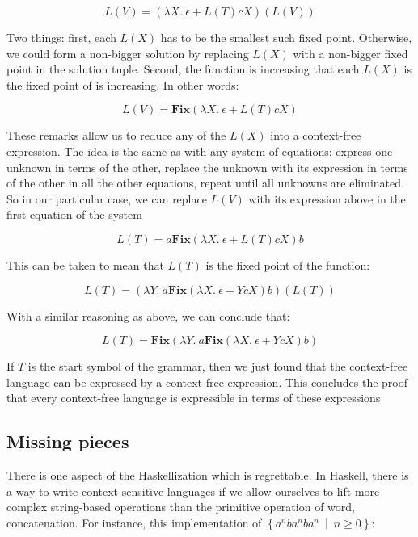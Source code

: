 $$L(V) = \left( 	\lambda X.\ \epsilon + L(T)cX\right)\left( L(V)\right)$$

Two things: first, each $L(X)$ has to be the smallest such fixed point. Otherwise, we could form a non-bigger solution by replacing $L(X)$ with a non-bigger fixed point in the solution tuple. Second, the function is increasing that each $L(X)$ is the fixed point of is increasing. In other words:

$$L(V) = \mathbf{Fix}\left( \lambda X.\ \epsilon + L(T)cX\right)$$

These remarks allow us to reduce any of the $L(X)$ into a context-free expression. The idea is the same as with any system of equations: express one unknown in terms of the other, replace the unknown with its expression in terms of the other in all the other equations, repeat until all unknowns are eliminated. So in our particular case, we can replace $L(V)$ with its expression above in the first equation of the system

$$L(T) = a\mathbf{Fix}\left( \lambda X.\ \epsilon + L(T)cX\right)b$$

This can be taken to mean that $L(T)$ is the fixed point of the function:

$$L(T) = \left(\lambda Y.\ a\mathbf{Fix}\left( \lambda X.\ \epsilon + YcX\right)b\right)\left(L(T)\right)$$

With a similar reasoning as above, we can conclude that:

$$L(T) = \mathbf{Fix}\left(\lambda Y.\ a\mathbf{Fix}\left( \lambda X.\ \epsilon + YcX\right)b\right)$$

If $T$ is the start symbol of the grammar, then we just found that the context-free language can be expressed by a context-free expression. This concludes the proof that every context-free language is expressible in terms of these expressions


\subsection{Missing pieces}

There is one aspect of the Haskellization which is regrettable. In Haskell, there is a way to write context-sensitive languages if we allow ourselves to lift more complex string-based operations than the primitive operation of word, concatenation. For instance, this implementation of $\left\lbrace a^nba^nba^n\ \middle|\ n\geq 0\right\rbrace$:



